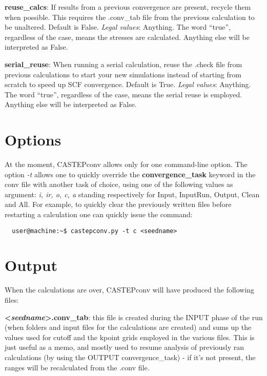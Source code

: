 \documentclass[10pt]{article}
\begin{document}
\textbf{reuse\_calcs}: If results from a previous convergence are present, 
recycle them when possible. This requires the .conv\_tab file from the previous 
calculation to be unaltered. Default is False.\newline
\textit{Legal values}: Anything. The word ``true'', regardless of the case, 
means the stresses are calculated. Anything else will be interpreted as 
False.\newline

\textbf{serial\_reuse}: When running a serial calculation, reuse the .check file from previous calculations to start your new simulations instead of starting from scratch to speed up SCF convergence. Default is True.\newline
\textit{Legal values}: Anything. The word ``true'', regardless of the case, 
means the serial reuse is employed. Anything else will be interpreted as 
False.\newline

\section{Options}

At the moment, CASTEPconv allows only for one command-line option. The option \textit{-t} allows one to quickly override the \textbf{convergence\_task} keyword in the conv file with another task of choice, using one of the following values as argument: \textit{i, ir, o, c, a} standing respectively for Input, InputRun, Output, Clean and All. For example, to quickly clear the previously written files before restarting a calculation one can quickly issue the command:

\begin{lstlisting}
  user@machine:~$ castepconv.py -t c <seedname>
\end{lstlisting}

\section{Output}

When the calculations are over, CASTEPconv will have produced the following 
files:

\textbf{\textless \textit{seedname}\textgreater.conv\_tab}: this file is created 
during the INPUT phase of the run (when folders and input files for the 
calculations are created) and sums up the values used for cutoff and the kpoint 
grids employed in the various files. This is just useful as a memo, and mostly 
used to resume analysis of previously ran calculations (by using the OUTPUT 
convergence\_task) - if it's not present, the ranges will be recalculated from 
the .conv file.
\end{document}
